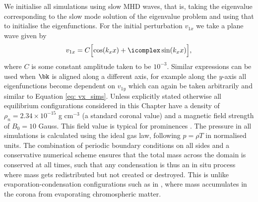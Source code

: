 We initialise all simulations using slow MHD waves, that is, taking the eigenvalue corresponding to the slow mode solution of the eigenvalue problem and using that to initialise the eigenfunctions.
For the initial perturbation $v_{1x}$ we take a plane wave given by
\begin{equation} \label{eq: vx_sims}
  v_{1x} = C\Bigl[\cos(k_x x) + \icomplex \sin(k_x x)\Bigr],
\end{equation}
where $C$ is some constant amplitude taken to be $10^{-3}$. Similar expressions can be used when $\bk$ is aligned along a different axis, for example along the $y$-axis all eigenfunctions become dependent on $v_{1y}$ which can again be taken arbitrarily and similar to Equation \eqref{eq: vx_sims}. Unless explicitly stated otherwise all equilibrium configurations considered in this Chapter have a density of $\rho_n = 2.34 \times 10^{-15}$ g cm$^{-3}$ (a standard coronal value) and a magnetic field strength of $B_0 = 10$ Gauss. This field value is typical for prominences \citep{gibson2018}. The pressure in all simulations is calculated using the ideal gas law, following $p = \rho T$ in normalised units. The combination of periodic boundary conditions on all sides and a conservative numerical scheme ensures that the total mass across the domain is conserved at all times, such that any condensation is thus an in situ process where mass gets redistributed but not created or destroyed. This is unlike evaporation-condensation configurations such as in \citet{xia2016}, where mass accumulates in the corona from evaporating chromospheric matter.

